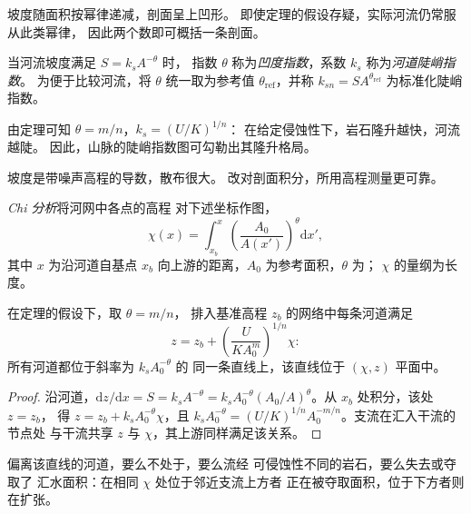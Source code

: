 坡度随面积按幂律递减，剖面呈上凹形。
即使定理的假设存疑，实际河流仍常服从此类幂律，
因此两个数即可概括一条剖面。

\begin{definition}[河道陡峭指数与凹度指数]\label{def:b3:quantitative-geomorphology:indices}
当河流坡度满足 $S = k_s A^{-\theta}$ 时，
指数 $\theta$ 称为\emph{凹度指数}，系数
$k_s$ 称为\emph{河道陡峭指数}。
为便于比较河流，将 $\theta$ 统一取为参考值
$\theta_{\mathrm{ref}}$，并称 $k_{sn} = S A^{\theta_{\mathrm{ref}}}$
为标准化陡峭指数。
\end{definition}

由定理可知 $\theta = m/n$，$k_s = (U/K)^{1/n}$：
在给定侵蚀性下，岩石隆升越快，河流越陡。
因此，山脉的陡峭指数图可勾勒出其隆升格局。


坡度是带噪声高程的导数，散布很大。
改对剖面积分，所用高程测量更可靠。

\begin{definition}[Chi 分析]\label{def:b3:quantitative-geomorphology:chi}
\emph{Chi 分析}将河网中各点的高程
对下述坐标作图，
\[
\chi(x) = \int_{x_b}^{x} \left(\frac{A_0}{A(x')}\right)^{\theta}
\mathrm{d}x' ,
\]
其中 $x$ 为沿河道自基点
$x_b$ 向上游的距离，$A_0$ 为参考面积，$\theta$ 为；
$\chi$ 的量纲为长度。
\end{definition}

\begin{proposition}\label{prop:b3:quantitative-geomorphology:chi}
在定理的假设下，取 $\theta = m/n$，
排入基准高程 $z_b$ 的网络中每条河道满足
\[
z = z_b + \left(\frac{U}{K A_0^{m}}\right)^{1/n} \chi :
\]
所有河道都位于斜率为 $k_s A_0^{-\theta}$ 的
同一条直线上，该直线位于 $(\chi, z)$ 平面中。
\end{proposition}

\begin{proof}
沿河道，$\mathrm{d}z/\mathrm{d}x = S = k_s A^{-\theta} = k_s
A_0^{-\theta}(A_0/A)^{\theta}$。从 $x_b$ 处积分，该处 $z = z_b$，
得 $z = z_b + k_s A_0^{-\theta}\chi$，且 $k_s A_0^{-\theta} =
(U/K)^{1/n} A_0^{-m/n}$。支流在汇入干流的节点处
与干流共享 $z$ 与 $\chi$，其上游同样满足该关系。
\end{proof}

偏离该直线的河道，要么不处于，要么流经
可侵蚀性不同的岩石，要么失去或夺取了
汇水面积：在相同 $\chi$ 处位于邻近支流上方者
正在被夺取面积，位于下方者则在扩张。

